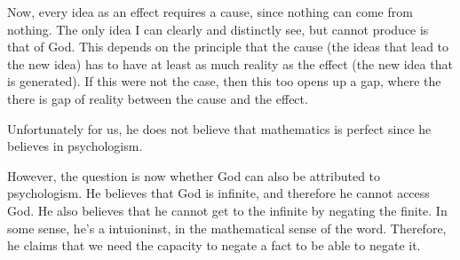\documentclass[11pt]{book}
\begin{document}
Now, every idea as an effect requires a cause, since nothing can come from
nothing. The only idea I can clearly and distinctly see, but cannot produce is
that of God. This depends on the principle that the cause (the ideas that lead
to the new idea) has to have at least as much reality as the effect (the new
idea that is generated). If this were not the case, then this too opens up a
gap, where the there is gap of reality between the cause and the effect.

Unfortunately for us, he does not believe that mathematics is perfect since he
believes in psychologism. 

However, the question is now whether God can also be attributed to
psychologism.  He believes that God is infinite, and therefore he cannot access
God. He also believes that he cannot get to the infinite by negating the
finite. In some sense, he's a intuioninst, in the mathematical sense of the
word.  Therefore, he claims that we need the capacity to negate a fact to be
able to negate it.
\end{document}
